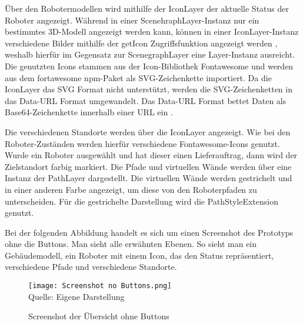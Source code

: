 Über den Robotermodellen wird mithilfe der IconLayer der aktuelle Status der Roboter angezeigt. Während in einer ScenehraphLayer-Instanz nur ein bestimmtes 3D-Modell angezeigt werden kann, können in einer IconLayer-Instanz verschiedene Bilder mithilfe der getIcon Zugriffsfunktion angezeigt werden \cite{DeckglIconLayer}, weshalb hierfür im Gegensatz zur ScenegraphLayer eine Layer-Instanz ausreicht. Die genutzten Icons stammen aus der Icon-Bibliothek Fontawesome und werden aus dem fortawesome \ac{npm}-Paket als \ac{SVG}-Zeichenkette importiert. Da die IconLayer das \ac{SVG} Format nicht unterstützt, werden die \ac{SVG}-Zeichenketten in das Data-\ac{URL} Format umgewandelt. Das Data-\ac{URL} Format bettet Daten als \gls{Base64}-Zeichenkette innerhalb einer \ac{URL} ein \cite{DataUrl}.

Die verschiedenen Standorte werden über die IconLayer angezeigt. Wie bei den Roboter-Zuständen werden hierfür verschiedene Fontawesome-Icons genutzt. Wurde ein Roboter ausgewählt und hat dieser einen Lieferauftrag, dann wird der Zielstandort farbig markiert. Die Pfade und virtuellen Wände werden über eine Instanz der PathLayer \cite{DeckglPathLayer} dargestellt. Die virtuellen Wände werden gestrichelt und in einer anderen Farbe angezeigt, um diese von den Roboterpfaden zu unterscheiden. Für die gestrichelte Darstellung wird die PathStyleExtension \cite{DeckglPathStyleExtension} genutzt.

Bei der folgenden Abbildung handelt es sich um einen Screenshot des Prototyps ohne die Buttons. Man sieht alle erwähnten Ebenen. So sieht man ein Gebäudemodell, ein Roboter mit einem Icon, das den Status repräsentiert, verschiedene Pfade und verschiedene Standorte.

\begin{figure}[H]
    \caption{Screenshot der Übersicht ohne Buttons}\label{fig:BackfaceCulling}
    \texttt{[image: Screenshot no Buttons.png]}
    \\
    Quelle: Eigene Darstellung
\end{figure}

